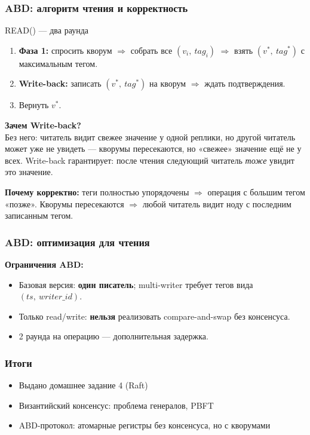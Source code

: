 \documentclass{beamer}
\begin{document}
\begin{frame}
\frametitle{ABD: алгоритм чтения и корректность}

\begin{block}{READ() --- два раунда}
\begin{enumerate}
  \item \textbf{Фаза 1:} спросить кворум $\Rightarrow$ собрать все $(v_i,\ \mathit{tag}_i)$ $\Rightarrow$ взять $(v^*,\ \mathit{tag}^*)$ с максимальным тегом.
  \item \textbf{Write-back:} записать $(v^*,\ \mathit{tag}^*)$ на кворум $\Rightarrow$ ждать подтверждения.
  \item Вернуть $v^*$.
\end{enumerate}
\end{block}

\vspace{0.2em}
\textbf{Зачем Write-back?}\\
\small Без него: читатель видит свежее значение у одной реплики, но другой читатель может уже не увидеть --- кворумы пересекаются, но «свежее» значение ещё не у всех. Write-back гарантирует: после чтения следующий читатель \emph{тоже} увидит это значение.

\vspace{0.3em}
\textbf{Почему корректно:} теги полностью упорядочены $\Rightarrow$ операция с большим тегом «позже». Кворумы пересекаются $\Rightarrow$ любой читатель видит ноду с последним записанным тегом.

\end{frame}

\begin{frame}
\frametitle{ABD: оптимизация для чтения}

\vspace{0.2em}
\textbf{Ограничения ABD:}
\begin{itemize}
  \item Базовая версия: \textbf{один писатель}; multi-writer требует тегов вида $(\mathit{ts},\ \mathit{writer\_id})$.
  \item Только read/write: \textbf{нельзя} реализовать compare-and-swap без консенсуса.
  \item 2 раунда на операцию --- дополнительная задержка.
\end{itemize}

\end{frame}

\begin{frame}
\frametitle{Итоги}

\begin{itemize}
    \item Выдано домашнее задание 4 (Raft)
    \item Византийский консенсус: проблема генералов, PBFT
    \item ABD-протокол: атомарные регистры без консенсуса, но с кворумами
\end{itemize}

\end{frame}
\end{document}
